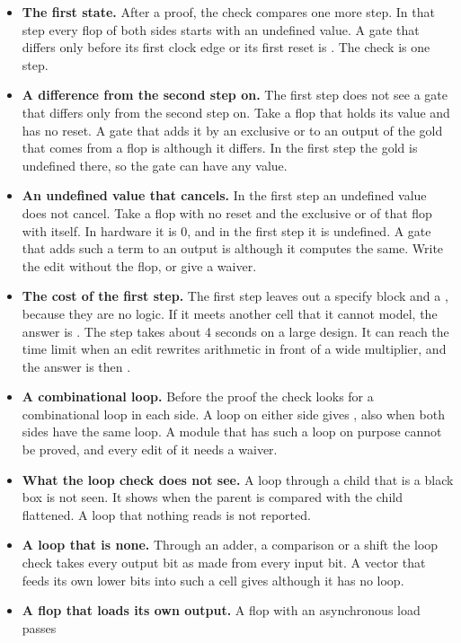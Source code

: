 \begin{itemize}
\item \textbf{The first state.} After a proof, the check compares one more step. In that
  step every flop of both sides starts with an undefined value. A gate that differs only
  before its first clock edge or its first reset is . The check is one step.
\item \textbf{A difference from the second step on.} The first step does not see a gate
  that differs only from the second step on. Take a flop that holds its value and has no
  reset. A gate that adds it by an exclusive or to an output of the gold that comes from a
  flop is  although it differs. In the first step the gold is undefined there,
  so the gate can have any value.
\item \textbf{An undefined value that cancels.} In the first step an undefined value does
  not cancel. Take a flop with no reset and the exclusive or of that flop with itself. In
  hardware it is 0, and in the first step it is undefined. A gate that adds such a term to
  an output is  although it computes the same. Write the edit without the flop,
  or give a waiver.
\item \textbf{The cost of the first step.} The first step leaves out a specify block and a
  , because they are no logic. If it meets another cell that it cannot
  model, the answer is . The step takes about 4 seconds on a large design. It
  can reach the time limit when an edit rewrites arithmetic in front of a wide multiplier,
  and the answer is then .
\item \textbf{A combinational loop.} Before the proof the check looks for a combinational
  loop in each side. A loop on either side gives , also when both sides have
  the same loop. A module that has such a loop on purpose cannot be proved, and every edit
  of it needs a waiver.
\item \textbf{What the loop check does not see.} A loop through a child that is a black box
  is not seen. It shows when the parent is compared with the child flattened. A loop that
  nothing reads is not reported.
\item \textbf{A loop that is none.} Through an adder, a comparison or a shift the loop
  check takes every output bit as made from every input bit. A vector that feeds its own
  lower bits into such a cell gives  although it has no loop.
\item \textbf{A flop that loads its own output.} A flop with an asynchronous load passes

\end{itemize}
